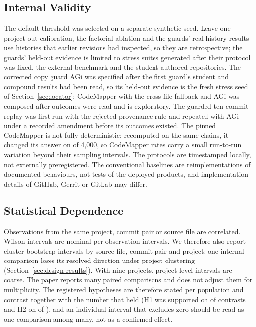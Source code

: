 \subsection{Internal Validity}
The default threshold was selected on a separate synthetic seed. Leave-one-project-out calibration, the factorial ablation and the guards' real-history results use histories that earlier revisions had inspected, so they are retrospective; the guards' held-out evidence is limited to stress suites generated after their protocol was fixed, the external benchmark and the student-authored repositories. The corrected copy guard AGi was specified after the first guard's student and compound results had been read, so its held-out evidence is the fresh stress seed of Section~\ref{sec:locator}; CodeMapper with the cross-file fallback and AGi was composed after outcomes were read and is exploratory. The guarded ten-commit replay was first run with the rejected provenance rule and repeated with AGi under a recorded amendment before its outcomes existed. The pinned CodeMapper is not fully deterministic: recomputed on the same chains, it changed its answer on \wiChIGateChains{} of 4,000, so CodeMapper rates carry a small run-to-run variation beyond their sampling intervals. The protocols are timestamped locally, not externally preregistered. The conventional baselines are reimplementations of documented behaviours, not tests of the deployed products, and implementation details of GitHub, Gerrit or GitLab may differ.

\subsection{Statistical Dependence}
Observations from the same project, commit pair or source file are correlated. Wilson intervals are nominal per-observation intervals. We therefore also report cluster-bootstrap intervals by source file, commit pair and project; one internal comparison loses its resolved direction under project clustering (Section~\ref{sec:design-results}). With nine projects, project-level intervals are coarse. The paper reports many paired comparisons and does not adjust them for multiplicity. The registered hypotheses are therefore stated per population and contrast together with the number that held (H1 was supported on \wiHypOneSupported{} of \wiHypOneTotal{} contrasts and H2 on \wiHypTwoSupported{} of \wiHypTwoTotal{}), and an individual interval that excludes zero should be read as one comparison among many, not as a confirmed effect.

